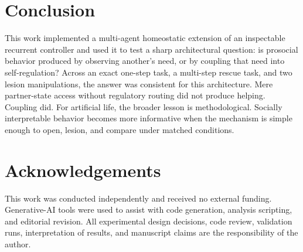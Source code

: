 \documentclass[letterpaper]{article}
\begin{document}
\section{Conclusion}

This work implemented a multi-agent homeostatic extension of an inspectable recurrent controller and used it to test a sharp architectural question: is prosocial behavior produced by observing another's need, or by coupling that need into self-regulation? Across an exact one-step task, a multi-step rescue task, and two lesion manipulations, the answer was consistent for this architecture. Mere partner-state access without regulatory routing did not produce helping. Coupling did. For artificial life, the broader lesson is methodological. Socially interpretable behavior becomes more informative when the mechanism is simple enough to open, lesion, and compare under matched conditions.

\section*{Acknowledgements}
This work was conducted independently and received no external funding.
Generative-AI tools were used to assist with code generation, analysis scripting, and editorial revision. All experimental design decisions, code review, validation runs, interpretation of results, and manuscript claims are the responsibility of the author.

{\small
}
\end{document}
